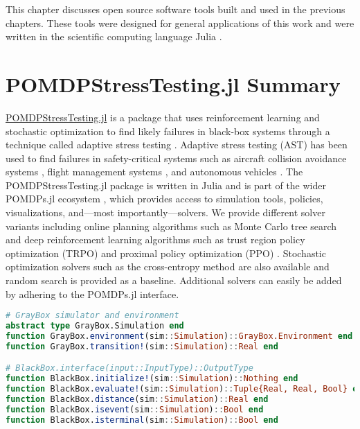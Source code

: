 This chapter discusses open source software tools built and used in the previous chapters.
These tools were designed for general applications of this work and were written in the scientific computing language Julia \cite{bezanson2017julia}.

\section{POMDPStressTesting.jl Summary}

\href{https://github.com/sisl/POMDPStressTesting.jl}{POMDPStressTesting.jl} is a package that uses reinforcement learning and stochastic optimization to find likely failures in black-box systems through a technique called adaptive stress testing \cite{ast}.
Adaptive stress testing (AST) has been used to find failures in safety-critical systems such as aircraft collision avoidance systems \cite{ast_acasx}, flight management systems \cite{ast_fms}, and autonomous vehicles \cite{ast_av}.
The POMDPStressTesting.jl package is written in Julia \cite{bezanson2017julia} and is part of the wider POMDPs.jl ecosystem \cite{pomdps_jl}, which provides access to simulation tools, policies, visualizations, and---most importantly---solvers.
We provide different solver variants including online planning algorithms such as Monte Carlo tree search \cite{mcts} and deep reinforcement learning algorithms such as trust region policy optimization (TRPO) \cite{trpo} and proximal policy optimization (PPO) \cite{ppo}.
Stochastic optimization solvers such as the cross-entropy method \cite{cem} are also available and random search is provided as a baseline.
Additional solvers can easily be added by adhering to the POMDPs.jl interface.

\begin{lstlisting}[language=Julia]
# GrayBox simulator and environment
abstract type GrayBox.Simulation end
function GrayBox.environment(sim::Simulation)::GrayBox.Environment end
function GrayBox.transition!(sim::Simulation)::Real end

# BlackBox.interface(input::InputType)::OutputType
function BlackBox.initialize!(sim::Simulation)::Nothing end
function BlackBox.evaluate!(sim::Simulation)::Tuple{Real, Real, Bool} end
function BlackBox.distance(sim::Simulation)::Real end
function BlackBox.isevent(sim::Simulation)::Bool end
function BlackBox.isterminal(sim::Simulation)::Bool end
\end{lstlisting}


